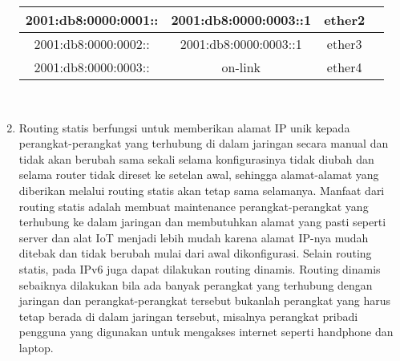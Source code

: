 \begin{enumerate}
\begin{tabular}{| c | c | c | c |}
		\hline
		2001:db8:0000:0001:: & 2001:db8:0000:0003::1 & ether2\\
		\hline
		2001:db8:0000:0002:: & 2001:db8:0000:0003::1 & ether3\\
		\hline
		2001:db8:0000:0003:: & on-link & ether4\\
		\hline
	\end{tabular}\\
	\item Routing statis berfungsi untuk memberikan alamat IP unik kepada perangkat-perangkat yang terhubung di dalam jaringan secara manual dan tidak akan berubah sama sekali selama konfigurasinya tidak diubah dan selama router tidak direset ke setelan awal, sehingga alamat-alamat yang diberikan melalui routing statis akan tetap sama selamanya. Manfaat dari routing statis adalah membuat maintenance perangkat-perangkat yang terhubung ke dalam jaringan dan membutuhkan alamat yang pasti seperti server dan alat IoT menjadi lebih mudah karena alamat IP-nya mudah ditebak dan tidak berubah mulai dari awal dikonfigurasi. Selain routing statis, pada IPv6 juga dapat dilakukan routing dinamis. Routing dinamis sebaiknya dilakukan bila ada banyak perangkat yang terhubung dengan jaringan dan perangkat-perangkat tersebut bukanlah perangkat yang harus tetap berada di dalam jaringan tersebut, misalnya perangkat pribadi pengguna yang digunakan untuk mengakses internet seperti handphone dan laptop.
\end{enumerate}